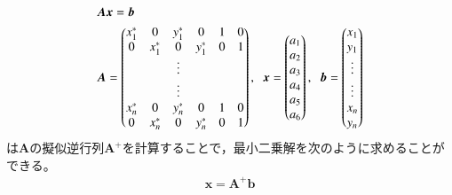 \documentclass[fleqn]{jreport}
\begin{document}
\begin{align}
&\mbox{\boldmath $Ax$}=\mbox{\boldmath $b$}\label{eq:affineLinear}  \\
&\mbox{\boldmath $A$} = \begin{pmatrix}
x^*_1 & 0 & y^*_1 & 0 & 1 & 0 \\ 
0 & x^*_1 & 0 & y^*_1 & 0 & 1 \\
& & \vdots &   &\\
& & \vdots &   &\\
x^*_n & 0 & y^*_n & 0 & 1 & 0 \\ 
0 & x^*_n & 0 & y^*_n & 0 & 1
\end{pmatrix} , \hspace{2mm}
\mbox{\boldmath $x$} = \begin{pmatrix}
a_1 \\ 
a_2 \\ 
a_3 \\ 
a_4 \\ 
a_5 \\ 
a_6
\end{pmatrix} , \hspace{2mm}
\mbox{\boldmath $b$}= \begin{pmatrix}
x_1 \\ 
y_1 \\
\vdots \\
\vdots \\
x_n \\ 
y_n
\end{pmatrix} \nonumber 
\end{align}
は$\bm{A}$の擬似逆行列$\bm{A}^+$を計算することで，最小二乗解を次のように求めることができる。
\begin{align}
\bm{x} = \bm{A}^+\bm{b}
\end{align}
\end{document}
